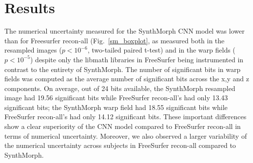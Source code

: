

\section*{Results}



The numerical uncertainty measured for the SynthMorph CNN model was lower than 
for Freesurfer recon-all (Fig.~\ref{sm_boxplot},
as measured both in the resampled images ($p < 10^{-6}$, two-tailed paired t-test) and in the warp fields ($p < 10^{-5}$) despite only the libmath libraries in FreeSurfer being instrumented in contrast to the entirety of SynthMorph. 
The number of significant bits in warp fields was computed as the average number of significant bits across the x,y and z components.
On average, out of 24 bits available, the SynthMorph resampled image had 19.56 significant bits while FreeSurfer recon-all's had only 13.43 significant bits; the SynthMorph warp field had 18.55 significant bits while FreeSurfer recon-all's had only 14.12 significant bits.
These important differences show a clear superiority of the CNN model compared to FreeSurfer recon-all in terms of numerical uncertainty. 
Moreover, we also observed a larger variability of the numerical uncertainty across subjects in FreeSurfer recon-all compared to SynthMorph. 





